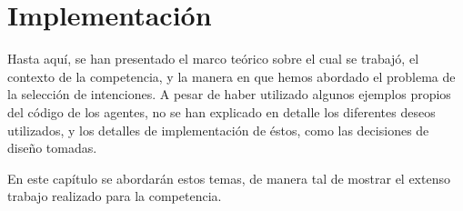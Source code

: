 \documentclass[oneside]{book}
\theoremstyle{definition}
\theoremstyle{example}
\begin{document}
%
%
%
%







\chapter{Implementación}

Hasta aquí, se han presentado el marco teórico sobre el cual se trabajó, el contexto
de la competencia, y la manera en que hemos abordado el problema de la selección de
intenciones. A pesar de haber utilizado algunos ejemplos propios del código de los 
agentes, no se han explicado en detalle los diferentes deseos utilizados, y los 
detalles de implementación de éstos, como las decisiones de diseño tomadas.

En este capítulo se abordarán estos temas, de manera tal de mostrar el extenso 
trabajo realizado para la competencia.
\end{document}
